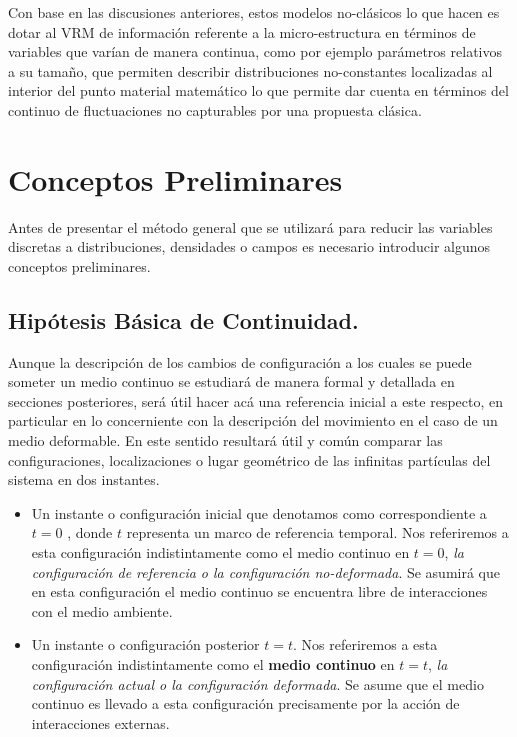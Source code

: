 \documentclass[../notas medios.tex]{subfiles}
\begin{document}
Con base en las discusiones anteriores, estos modelos no-clásicos lo que hacen es dotar al VRM de información referente a la micro-estructura en términos de variables que varían de manera continua, como por ejemplo parámetros relativos a su tamaño, que permiten describir distribuciones no-constantes localizadas al interior del punto material matemático lo que permite dar cuenta en términos del continuo de fluctuaciones no capturables por una propuesta clásica.

\section{Conceptos Preliminares}
Antes de presentar el método general que se utilizará para reducir las variables discretas a distribuciones, densidades o campos es necesario introducir algunos conceptos preliminares.

\subsection{Hipótesis Básica de Continuidad.}
Aunque la descripción de los cambios de configuración a los cuales se puede someter un medio continuo se estudiará de manera formal y detallada en secciones posteriores, será útil hacer acá una referencia inicial a este respecto, en particular en lo concerniente con la descripción del movimiento en el caso de un medio deformable.  En este sentido resultará útil y común comparar las configuraciones, localizaciones o lugar geométrico de las infinitas partículas del sistema en dos instantes.

\begin{itemize}
\item Un instante o configuración inicial que denotamos como correspondiente a $t=0$ , donde $t$ representa un marco de referencia temporal.  Nos referiremos a esta configuración indistintamente como el medio continuo en $t=0$, \textit{la configuración de referencia o la configuración no-deformada}.  Se asumirá que en esta configuración el medio continuo se encuentra libre de interacciones con el medio ambiente.

\item Un instante o configuración posterior $t=t$.  Nos referiremos a esta configuración indistintamente como el {\bf medio continuo} en $t=t$, \textit{la configuración actual o la configuración deformada}.  Se asume que el medio continuo es llevado a esta configuración precisamente por la acción de interacciones externas. 

\end{itemize}
\end{document}
